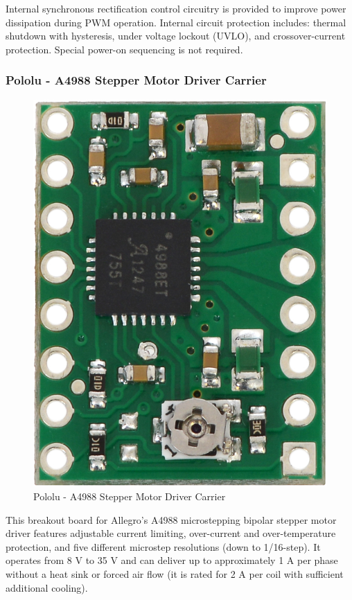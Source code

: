 Internal synchronous rectification control circuitry is provided to improve power dissipation during PWM operation. Internal circuit protection includes: thermal shutdown with hysteresis, under voltage lockout (UVLO), and crossover-current protection. Special power-on sequencing is not required\cite{A4988_allegro_thesis}.

\subsubsection{Pololu - A4988 Stepper Motor Driver Carrier}
\begin{figure}[H]
	\centering
	\includegraphics[width=\maxwidth{5cm}, keepaspectratio]{Chapters/Fig/pololu_A4988.jpg}
	\caption{Pololu - A4988 Stepper Motor Driver Carrier}
	\label{fig:pololu_A4988}
\end{figure}
This breakout board for Allegro's A4988 microstepping bipolar stepper motor driver features adjustable current limiting, over-current and over-temperature protection, and five different microstep resolutions (down to 1/16-step). It operates from 8 V to 35 V and can deliver up to approximately 1 A per phase without a heat sink or forced air flow (it is rated for 2 A per coil with sufficient additional cooling).

